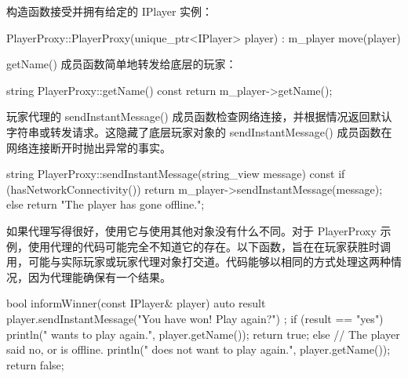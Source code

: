 构造函数接受并拥有给定的 IPlayer 实例：

\begin{cpp}
PlayerProxy::PlayerProxy(unique_ptr<IPlayer> player)
    : m_player { move(player) } { }
\end{cpp}

getName() 成员函数简单地转发给底层的玩家：

\begin{cpp}
string PlayerProxy::getName() const { return m_player->getName(); }
\end{cpp}

玩家代理的 sendInstantMessage() 成员函数检查网络连接，并根据情况返回默认字符串或转发请求。这隐藏了底层玩家对象的 sendInstantMessage() 成员函数在网络连接断开时抛出异常的事实。

\begin{cpp}
string PlayerProxy::sendInstantMessage(string_view message) const
{
    if (hasNetworkConnectivity()) { return m_player->sendInstantMessage(message); }
    else { return "The player has gone offline."; }
}
\end{cpp}


如果代理写得很好，使用它与使用其他对象没有什么不同。对于 PlayerProxy 示例，使用代理的代码可能完全不知道它的存在。以下函数，旨在在玩家获胜时调用，可能与实际玩家或玩家代理对象打交道。代码能够以相同的方式处理这两种情况，因为代理能确保有一个结果。

\begin{cpp}
bool informWinner(const IPlayer& player)
{
    auto result { player.sendInstantMessage("You have won! Play again?") };
    if (result == "yes") {
        println("{} wants to play again.", player.getName());
        return true;
    } else {
        // The player said no, or is offline.
        println("{} does not want to play again.", player.getName());
        return false;
    }
}
\end{cpp}






